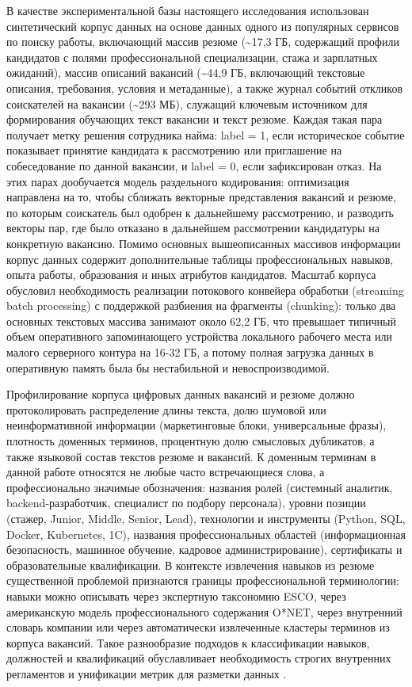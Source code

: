В качестве экспериментальной базы настоящего исследования использован синтетический корпус данных на основе данных одного из популярных сервисов по поиску работы, включающий массив резюме (\textasciitilde{}17,3 ГБ, содержащий профили кандидатов с полями профессиональной специализации, стажа и зарплатных ожиданий), массив описаний вакансий (\textasciitilde{}44,9 ГБ, включающий текстовые описания, требования, условия и метаданные), а также журнал событий откликов соискателей на вакансии (\textasciitilde{}293 МБ), служащий ключевым источником для формирования обучающих текст вакансии и текст резюме. Каждая такая пара получает метку решения сотрудника найма: label = 1, если историческое событие показывает принятие кандидата к рассмотрению или приглашение на собеседование по данной вакансии, и label = 0, если зафиксирован отказ. На этих парах дообучается модель раздельного кодирования: оптимизация направлена на то, чтобы сближать векторные представления вакансий и резюме, по которым соискатель был одобрен к дальнейшему рассмотрению, и разводить векторы пар, где было отказано в дальнейшем рассмотрении кандидатуры на конкретную вакансию. Помимо основных вышеописанных массивов информации корпус данных содержит дополнительные таблицы профессиональных навыков, опыта работы, образования и иных атрибутов кандидатов. Масштаб корпуса обусловил необходимость реализации потокового конвейера обработки (streaming batch processing) с поддержкой разбиения на фрагменты (chunking): только два основных текстовых массива занимают около 62,2 ГБ, что превышает типичный объем оперативного запоминающего устройства локального рабочего места или малого серверного контура на 16-32 ГБ, а потому полная загрузка данных в оперативную память была бы нестабильной и невоспроизводимой.\par
Профилирование корпуса цифровых данных вакансий и резюме должно протоколировать распределение длины текста, долю шумовой или неинформативной информации (маркетинговые блоки, универсальные фразы), плотность доменных терминов, процентную долю смысловых дубликатов, а также языковой состав текстов резюме и вакансий. К доменным терминам в данной работе относятся не любые часто встречающиеся слова, а профессионально значимые обозначения: названия ролей (системный аналитик, backend-разработчик, специалист по подбору персонала), уровни позиции (стажер, Junior, Middle, Senior, Lead), технологии и инструменты (Python, SQL, Docker, Kubernetes, 1C), названия профессиональных областей (информационная безопасность, машинное обучение, кадровое администрирование), сертификаты и образовательные квалификации. В контексте извлечения навыков из резюме существенной проблемой признаются границы профессиональной терминологии: навыки можно описывать через экспертную таксономию ESCO, через американскую модель профессионального содержания O*NET, через внутренний словарь компании или через автоматически извлеченные кластеры терминов из корпуса вакансий. Такое разнообразие подходов к классификации навыков, должностей и квалификаций обуславливает необходимость строгих внутренних регламентов и унификации метрик для разметки данных \cite{src18, src30, src31}.\par
